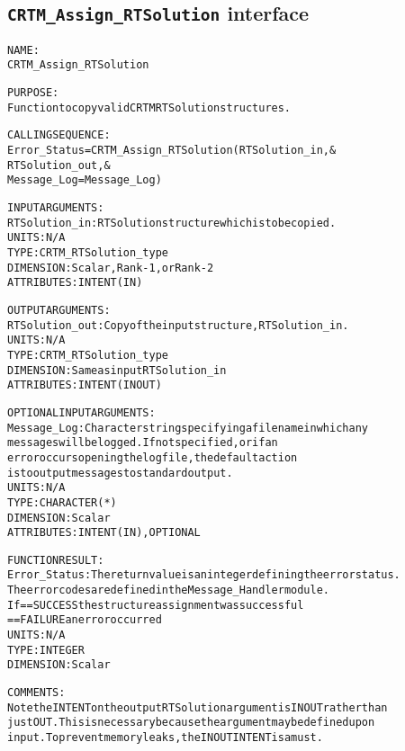 \subsection{\texttt{CRTM\_Assign\_RTSolution} interface}
  \label{sec:CRTM_Assign_RTSolution_interface}
  \begin{alltt}
 
  NAME:
        CRTM_Assign_RTSolution
 
  PURPOSE:
        Function to copy valid CRTM RTSolution structures.
 
  CALLING SEQUENCE:
        Error_Status = CRTM_Assign_RTSolution( RTSolution_in          , &
                                               RTSolution_out         , &
                                               Message_Log=Message_Log  )
 
  INPUT ARGUMENTS:
        RTSolution_in:   RTSolution structure which is to be copied.
                         UNITS:      N/A
                         TYPE:       CRTM_RTSolution_type
                         DIMENSION:  Scalar, Rank-1, or Rank-2
                         ATTRIBUTES: INTENT(IN)
 
  OUTPUT ARGUMENTS:
        RTSolution_out:  Copy of the input structure, RTSolution_in.
                         UNITS:      N/A
                         TYPE:       CRTM_RTSolution_type
                         DIMENSION:  Same as input RTSolution_in
                         ATTRIBUTES: INTENT(IN OUT)
 
 
  OPTIONAL INPUT ARGUMENTS:
        Message_Log:     Character string specifying a filename in which any
                         messages will be logged. If not specified, or if an
                         error occurs opening the log file, the default action
                         is to output messages to standard output.
                         UNITS:      N/A
                         TYPE:       CHARACTER(*)
                         DIMENSION:  Scalar
                         ATTRIBUTES: INTENT(IN), OPTIONAL
 
  FUNCTION RESULT:
        Error_Status:    The return value is an integer defining the error status.
                         The error codes are defined in the Message_Handler module.
                         If == SUCCESS the structure assignment was successful
                            == FAILURE an error occurred
                         UNITS:      N/A
                         TYPE:       INTEGER
                         DIMENSION:  Scalar
 
  COMMENTS:
        Note the INTENT on the output RTSolution argument is IN OUT rather than
        just OUT. This is necessary because the argument may be defined upon
        input. To prevent memory leaks, the IN OUT INTENT is a must.
 
  \end{alltt}
